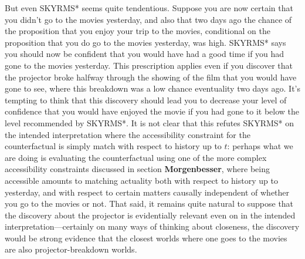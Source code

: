 \documentclass[leqno, 11pt, a5paper, openany]{article}
\begin{document}
But even SKYRMS* seems quite tendentious. Suppose you are now certain that you didn't go to the movies yesterday, and also that two days ago the chance of the proposition that you enjoy your trip to the movies, conditional on the proposition that you do go to the movies yesterday, was high. SKYRMS* says you should now be confident that you would have had a good time if you had gone to the movies yesterday. This prescription applies even if you discover that the projector broke halfway through the showing of the film that you would have gone to see, where this breakdown was a low chance eventuality two days ago. It's tempting to think that this discovery should lead you to decrease your level of confidence that you would have enjoyed the movie if you had gone to it below the level recommended by SKYRMS*. It is not clear that this refutes SKYRMS* on the intended interpretation where the accessibility constraint for the counterfactual is simply match with respect to history up to $t$: perhaps what we are doing is evaluating the counterfactual using one of the more complex accessibility constraints discussed in section \textbf{Morgenbesser}, where being accessible amounts to matching actuality both with respect to history up to yesterday, and with respect to certain matters causally independent of whether you go to the movies or not. That said, it remains quite natural to suppose that the discovery about the projector is evidentially relevant even on in the intended interpretation---certainly on many ways of thinking about closeness, the discovery would be strong evidence that the closest worlds where one goes to the movies are also projector-breakdown worlds.
\end{document}
